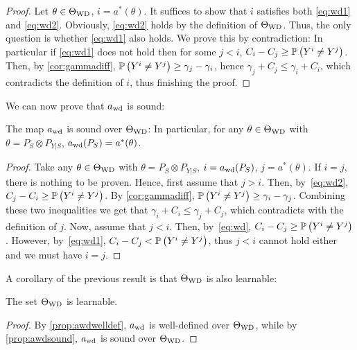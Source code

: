 \begin{proof}
	Let $\theta\in \Theta_{\mathrm{WD}}$, $i = a^*(\theta)$. 
	It suffices to show that $i$ satisfies both \eqref{eq:wd1} and \eqref{eq:wd2}.
	Obviously, \eqref{eq:wd2} holds by the definition of $\Theta_{\mathrm{WD}}$.
	Thus, the only question is whether \eqref{eq:wd1} also holds.
	We prove this by contradiction:
	In particular if \eqref{eq:wd1} does not hold then for some $j<i$, $C_i-C_j \ge \mathbb{P}\left(Y^i \ne Y^j\right)$. 
	Then, by \cref{cor:gammadiff}, $\mathbb{P}\left( Y^i \ne Y^j\right) \ge \gamma_j - \gamma_i$, hence $\gamma_j + C_j \le \gamma_i + C_i$, which contradicts the definition of $i$, thus finishing the proof. 
	\end{proof}
We can now prove that $a_{\mathrm{wd}}$ is sound:
\begin{prop}
	\label{prop:awdsound}
	The map $a_{\mathrm{wd}}$ is sound over $\Theta_{\mathrm{WD}}$: In particular, for any
	$\theta\in \Theta_{\mathrm{WD}}$ with $\theta = P_S\otimes P_{Y|S}$, $a_{\mathrm{wd}}(P_S)= a^*(\theta)$.
\end{prop}
\begin{proof}
	Take any $\theta\in \Theta_{\mathrm{WD}}$ with $\theta = P_S\otimes P_{Y|S}$, $i = a_{\mathrm{wd}}(P_S)$, $j = a^*(\theta)$.
	If $i=j$, there is nothing to be proven. Hence, first assume that $j>i$. Then, by~\eqref{eq:wd2}, $C_j - C_i \ge \mathbb{P}\left(Y^i \ne Y^j\right)$.
	By \cref{cor:gammadiff}, $\mathbb{P}\left(Y^i \ne Y^j \right) \ge \gamma_i - \gamma_j$. Combining these two inequalities we get that
	$\gamma_i + C_i \le \gamma_j + C_j$, which contradicts with the definition of $j$.
	Now, assume that $j<i$. Then, by~\eqref{eq:wd}, $C_i - C_j \ge \mathbb{P}\left(Y^i \ne Y^j\right)$.
	However, by~\eqref{eq:wd1}, $C_i -C_j < \mathbb{P}\left(Y^i \ne Y^j\right)$, thus $j<i$ cannot hold either and we must have $i=j$.
	\end{proof}
A corollary of the previous result is that $\Theta_{\mathrm{WD}}$ is also learnable:
\begin{thm}\label{cor:twdlearnable}
	The set $\Theta_{\mathrm{WD}}$ is learnable.
\end{thm}
\begin{proof}
	By \cref{prop:awdwelldef}, $a_{\mathrm{wd}}$ is well-defined over $\Theta_{\mathrm{WD}}$, while by \cref{prop:awdsound}, $a_{\mathrm{wd}}$ is sound over $\Theta_{\mathrm{WD}}$.
\end{proof}

